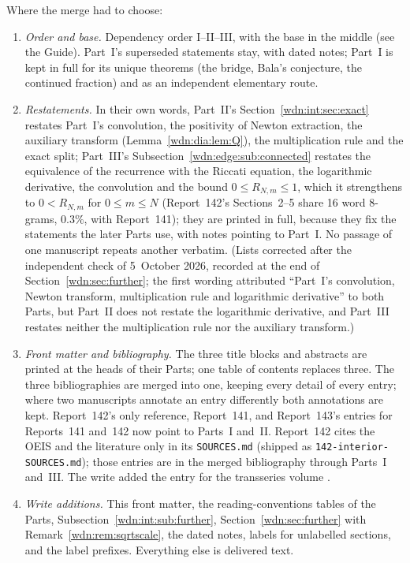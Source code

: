 \documentclass[11pt,letterpaper]{article}
\theoremstyle{remark}\newtheorem{remark}[theorem]{Remark}
\newcommand{\file}[1]{\nolinkurl{#1}}
\begin{document}
Where the merge had to choose:
\begin{enumerate}
\item \emph{Order and base.} Dependency order I--II--III, with the base in the middle (see the Guide). Part~I's superseded statements stay, with dated notes; Part~I is kept in full for its unique theorems (the bridge, Bala's conjecture, the continued fraction) and as an independent elementary route.
\item \emph{Restatements.} In their own words, Part~II's Section~\ref{wdn:int:sec:exact} restates Part~I's convolution, the positivity of Newton extraction, the auxiliary transform (Lemma~\ref{wdn:dia:lem:Q}), the multiplication rule and the exact split; Part~III's Subsection~\ref{wdn:edge:sub:connected} restates the equivalence of the recurrence with the Riccati equation, the logarithmic derivative, the convolution and the bound $0\le R_{N,m}\le1$, which it strengthens to $0<R_{N,m}$ for $0\le m\le N$ (Report~142's Sections~2--5 share 16 word 8-grams, $0.3\%$, with Report~141); they are printed in full, because they fix the statements the later Parts use, with notes pointing to Part~I. No passage of one manuscript repeats another verbatim. \textup{(Lists corrected after the independent check of 5~October 2026, recorded at the end of Section~\ref{wdn:sec:further}; the first wording attributed ``Part~I's convolution, Newton transform, multiplication rule and logarithmic derivative'' to both Parts, but Part~II does not restate the logarithmic derivative, and Part~III restates neither the multiplication rule nor the auxiliary transform.)}
\item \emph{Front matter and bibliography.} The three title blocks and abstracts are printed at the heads of their Parts; one table of contents replaces three. The three bibliographies are merged into one, keeping every detail of every entry; where two manuscripts annotate an entry differently both annotations are kept. Report~142's only reference, Report~141, and Report~143's entries for Reports~141 and~142 now point to Parts~I and~II. Report~142 cites the OEIS and the literature only in its \file{SOURCES.md} (shipped as \file{142-interior-SOURCES.md}); those entries are in the merged bibliography through Parts~I and~III. The write added the entry for the transseries volume \cite{TSvol}.
\item \emph{Write additions.} This front matter, the reading-conventions tables of the Parts, Subsection~\ref{wdn:int:sub:further}, Section~\ref{wdn:sec:further} with Remark~\ref{wdn:rem:sqrtscale}, the dated notes, labels for unlabelled sections, and the label prefixes. Everything else is delivered text.
\end{enumerate}
\end{document}
